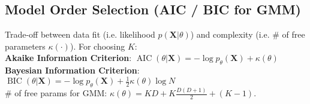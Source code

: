 \subsection*{Model Order Selection (AIC / BIC for GMM)}
Trade-off between data fit (i.e. likelihood $p(\mathbf{X} | \theta)$) and complexity (i.e. \# of free parameters $\kappa(\cdot)$). For choosing $K$:\\
\textbf{Akaike Information Criterion}: $\operatorname{AIC}(\theta | \mathbf{X}) = -\log p_\theta(\mathbf{X}) + \kappa(\theta)$\\
\textbf{Bayesian Information Criterion}: $\operatorname{BIC}(\theta | \mathbf{X}) = -\log p_\theta(\mathbf{X}) + \frac{1}{2} \kappa(\theta) \log N$\\
\# of free params for GMM: $\kappa(\theta) = KD + K\frac{D(D+1)}{2} + (K - 1)$.\\

